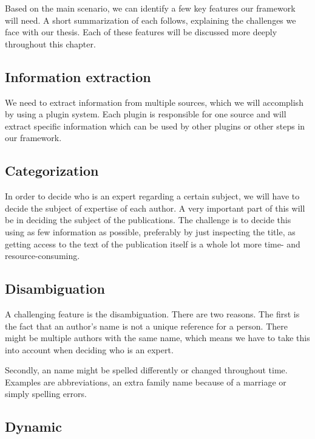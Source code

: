 Based on the main scenario, we can identify a few key features our framework will need. A short summarization of each follows, explaining the challenges we face with our thesis. Each of these features will be discussed more deeply throughout this chapter.


\subsection{Information extraction}

We need to extract information from multiple sources, which we will accomplish by using a plugin system. Each plugin is responsible for one source and will extract specific information which can be used by other plugins or other steps in our framework.

\subsection{Categorization}

In order to decide who is an expert regarding a certain subject, we will have to decide the subject of expertise of each author. A very important part of this will be in deciding the subject of the publications. The challenge is to decide this using as few information as possible, preferably by just inspecting the title, as getting access to the text of the publication itself is a whole lot more time- and resource-consuming.

\subsection{Disambiguation}

A challenging feature is the disambiguation. There are two reasons. The first is the fact that an author's name is not a unique reference for a person. There might be multiple authors with the same name, which means we have to take this into account when deciding who is an expert.

Secondly, an name might be spelled differently or changed throughout time. Examples are abbreviations, an extra family name because of a marriage or simply spelling errors.

\subsection{Dynamic}

